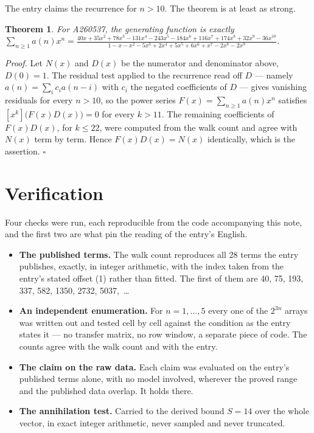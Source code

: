 \documentclass[11pt]{article}
\newtheorem{theorem}{Theorem}
\theoremstyle{definition}
\begin{document}
The entry claims the recurrence for $n > 10$. The theorem is at least as strong.

\begin{theorem} For A260537, the generating function is exactly $\sum_{n\ge 1} a(n)x^n = \frac{40x + 35x^{2} + 78x^{3} - 131x^{4} - 243x^{5} - 184x^{6} + 116x^{7} + 174x^{8} + 32x^{9} - 36x^{10}}{1 - x - x^{2} - 5x^{3} + 2x^{4} + 5x^{5} + 6x^{6} + x^{7} - 2x^{8} - 2x^{9}}$.\end{theorem}

{\itshape Proof.} Let $N(x)$ and $D(x)$ be the numerator and denominator above, $D(0)=1$. The residual test applied to the recurrence read off $D$ --- namely $a(n) = \sum_i c_i a(n-i)$ with $c_i$ the negated coefficients of $D$ --- gives vanishing residuals for every $n > 10$, so the power series $F(x)=\sum_{n\ge 1}a(n)x^n$ satisfies $[x^k]\bigl(F(x)D(x)\bigr) = 0$ for every $k > 11$. The remaining coefficients of $F(x)D(x)$, for $k \le 22$, were computed from the walk count and agree with $N(x)$ term by term. Hence $F(x)D(x) = N(x)$ identically, which is the assertion. $\square$

\section{Verification}

Four checks were run, each reproducible from the code accompanying this note, and the first two are what pin the reading of the entry's English.

\begin{itemize}

\item {\bfseries The published terms.} The walk count reproduces all 28 terms the entry publishes, exactly, in integer arithmetic, with the index taken from the entry's stated offset (1) rather than fitted. The first of them are 40, 75, 193, 337, 582, 1350, 2732, 5037,~\dots

\item {\bfseries An independent enumeration.} For $n = 1,\dots,5$ every one of the $2^{3n}$ arrays was written out and tested cell by cell against the condition as the entry states it --- no transfer matrix, no row window, a separate piece of code. The counts agree with the walk count and with the entry.

\item {\bfseries The claim on the raw data.} Each claim was evaluated on the entry's published terms alone, with no model involved, wherever the proved range and the published data overlap. It holds there.

\item {\bfseries The annihilation test.} Carried to the derived bound $S = 14$ over the whole vector, in exact integer arithmetic, never sampled and never truncated.

\end{itemize}
\end{document}
